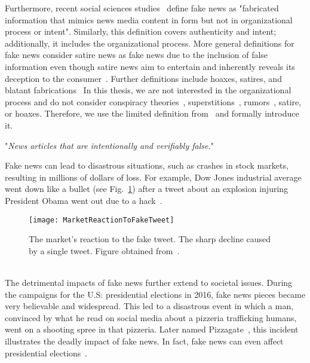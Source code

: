 Furthermore, recent social sciences studies~\parencite{TheScienceOfFakeNews_Lazer} define fake news as "fabricated information that mimics news media content in form but not in organizational process or intent". Similarly, this definition covers authenticity and intent; additionally, it includes the organizational process. More general definitions for fake news consider satire news as fake news due to the inclusion of false information even though satire news aim to entertain and inherently reveals its deception to the consumer~\parencite{WhenFakeNewsBecomesReal_Balmas, TheImpactOfRealNewsAboutFakeNews_Brewer, NewsVerificationByExploitingConflictingSocialViewpoints_Jin, FakeNewsOrTruthUsingSatiricalCues_Rubin}. Further definitions include hoaxes, satires, and blatant
fabrications~\parencite{DeceptionDetectionForFakeNews3TypesOfFakeNews_Rubin}
In this thesis, we are not interested in the organizational process and do not consider conspiracy theories~\parencite{ConspiracyTheories_Sunstein}, superstitions~\parencite{Superstition_Lindeman}, rumors~\parencite{RumorsAndHealthCareReform_Berinsky}, satire, or hoaxes. Therefore, we use the limited definition from~\parencite{SocialMediaAndFakeNewsIn2016Election_Allcott} and formally introduce it.
\begin{definition}
    "\emph{News articles that are intentionally and verifiably false.}"~\parencite{SocialMediaAndFakeNewsIn2016Election_Allcott}
\end{definition}
Fake news can lead to disastrous situations, such as crashes in stock markets, resulting in millions of dollars of loss. For example, Dow Jones industrial average went down like a bullet (see Fig.~\ref{fig:MarketReactionToFakeTweet}) after a tweet about an explosion injuring President Obama went out due to a hack~\parencite{MarketQuaversAfterFakeAPTweet_ElBoghdady}.
\begin{figure}
    \centering
    \texttt{[image: MarketReactionToFakeTweet]}
    \caption[Market Reaction to Fake Tweet.]{The market's reaction to the fake tweet. The sharp decline caused by a single tweet. Figure obtained from~\parencite{MarketQuaversAfterFakeAPTweet_ElBoghdady}.}\label{fig:MarketReactionToFakeTweet}
\end{figure}\\
The detrimental impacts of fake news further extend to societal issues. During the campaigns for the U.S: presidential elections in 2016, fake news pieces became very believable and widespread. This led to a disastrous event in which a man, convinced by what he read on social media about a pizzeria trafficking humans, went on a shooting spree in that pizzeria. Later named Pizzagate~\parencite{Pizzagate_Fisher}, this incident illustrates the deadly impact of fake news. In fact, fake news can even affect presidential elections~\parencite{SocialMediaAndFakeNewsIn2016Election_Allcott, TrumpWonBecauseOfFacebook_Read}.\\
